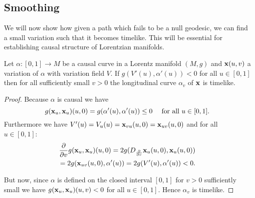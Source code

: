 \subsection{Smoothing}
We will now show how given a path which fails to be a null geodesic, we can find a small variation such that it becomes timelike. This will be essential for establishing causal structure of Lorentzian manifolds.

\begin{lemma}
Let $\alpha:[0,1]\to M$ be a causal curve in a Lorentz manifold $(M,g)$ and $\mathbf{x}(u,v)$ a variation of $\alpha$ with variation field $V$. If $g(V'(u),\alpha'(u))<0$ for all $u\in [0,1]$ then for all sufficiently small $v>0$ the longitudinal curve $\alpha_v$ of $\mathbf{x}$ is timelike.
\end{lemma}
\begin{proof}
Because $\alpha$ is causal we have 
\[
    g(\mathbf{x}_u,\mathbf{x}_u)(u,0) = g(\alpha'(u),\alpha'(u)) \leq 0 \quad \text{ for all }u\in[0,1].
\]
Furthermore we have $V'(u) = V_u(u) = \mathbf{x}_{vu}(u,0) = \mathbf{x}_{uv}(u,0)$ and for all $u\in [0,1]$:
\begin{align*}
    \frac{\partial}{\partial v}g(\mathbf{x}_u,\mathbf{x}_u)(u,0) = 2g(D_{\frac{\partial}{\partial v}}\mathbf{x}_u(u,0),\mathbf{x}_u(u,0))\\
    = 2g(\mathbf{x}_{uv}(u,0), \alpha'(u)) = 2g(V'(u),\alpha'(u)) < 0.
\end{align*}

But now, since $\alpha$ is defined on the closed interval $[0,1]$ for $v>0$ sufficiently small we have $g(\mathbf{x}_u,\mathbf{x}_u)(u,v)<0$ for all $u\in [0,1]$. Hence $\alpha_v$ is timelike.
\end{proof}

